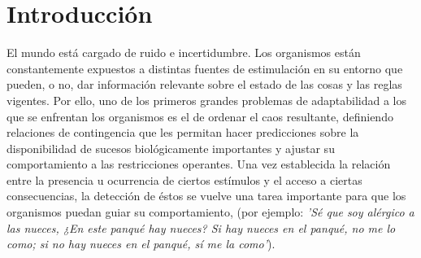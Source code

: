 
\chapter{Introducción} %

\label{Chapter1} %


\newcommand{\keyword}[1]{\textbf{#1}}
\newcommand{\tabhead}[1]{\textbf{#1}}
\newcommand{\code}[1]{\texttt{#1}}
\newcommand{\file}[1]{\texttt{\bfseries#1}}
\newcommand{\option}[1]{\texttt{\itshape#1}}


El mundo está cargado de ruido e incertidumbre. Los organismos están constantemente expuestos a distintas fuentes de estimulación en su entorno que pueden, o no, dar información relevante sobre el estado de las cosas y las reglas vigentes. Por ello, uno de los primeros grandes problemas de adaptabilidad a los que se enfrentan los organismos es el de ordenar el caos resultante, definiendo relaciones de contingencia que les permitan hacer predicciones sobre la disponibilidad de sucesos biológicamente importantes y ajustar su comportamiento a las restricciones operantes. Una vez establecida la relación entre la presencia u ocurrencia de ciertos estímulos y el acceso a ciertas consecuencias, la detección de éstos se vuelve una tarea importante para que los organismos puedan guiar su comportamiento, (por ejemplo: \textit{'Sé que soy alérgico a las nueces, ¿En este panqué hay nueces? Si hay nueces en el panqué, no me lo como; si no hay nueces en el panqué, sí me la como'}).\\


